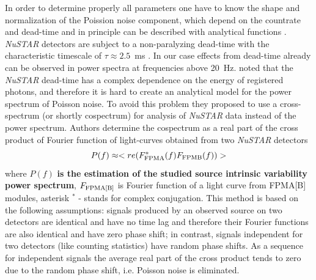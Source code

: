\documentclass[a4paper,fleqn,usenatbib]{mnras}
\begin{document}
In order to determine properly all parameters one have to know the shape and normalization of the Poission noise component, which depend on the countrate and dead-time and in principle can be described with analytical functions \citep[see, e.g.,][]{1994A&A...287...73V, 1995ApJ...449..930Z}.
{\it NuSTAR} detectors are subject to a non-paralyzing dead-time with the characteristic timescale of $\tau \approx 2.5$~ms \citep{2015ApJ...800..109B}.
In our case effects from dead-time already can be observed in power spectra at frequencies above 20~Hz.
\citet{2015ApJ...800..109B} noted that the {\it NuSTAR} dead-time has a complex dependence on the energy of registered photons, and therefore it is hard to create an analytical model for the power spectrum of Poisson noise. 
To avoid this problem they proposed to use a cross-spectrum (or shortly cospectrum) for analysis of {\it NuSTAR} data instead of the power spectrum. 
Authors determine the cospectrum as a real part of the cross product of Fourier function of light-curves obtained from two {\it NuSTAR} detectors 
\begin{equation}
        \label{eq: ps_estimation}
        P(f) \approx <re(F_{\rm FPMA}^{*}(f)F_{\rm FPMB}(f))>
\end{equation}
where $P(f)$ {\bf is the estimation of the studied source intrinsic variability power spectrum}, $F_{\rm FPMA[B]}$ is Fourier function of a light curve from FPMA[B] modules, asterisk $^{*}$ - stands for complex conjugation. 
This method is based on the following assumptions: signals produced by an observed source on two detectors are identical and have no time lag and therefore their Fourier functions are also identical and have zero phase shift; in contrast, signals independent for two detectors (like counting statistics) have random phase shifts.  
As a sequence for independent signals the average real part of the cross product tends to zero due to the random phase shift, i.e. Poisson noise is eliminated.
\end{document}
